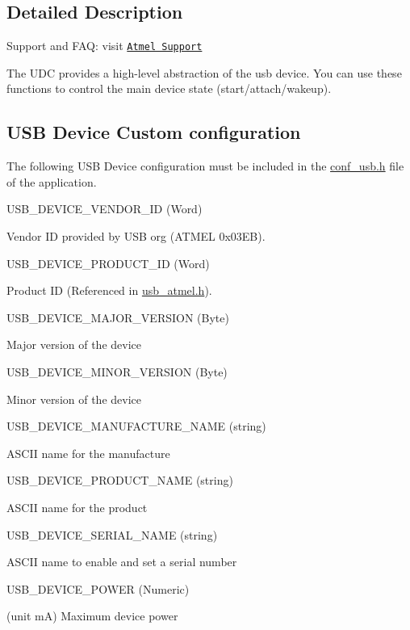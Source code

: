 \subsection{Detailed Description}
Support and F\-A\-Q\-: visit \href{http://www.atmel.com/design-support/}{\tt Atmel Support}

The U\-D\-C provides a high-\/level abstraction of the usb device. You can use these functions to control the main device state (start/attach/wakeup).\hypertarget{group__udc__group_USB_DEVICE_CONF}{}\subsection{U\-S\-B Device Custom configuration}\label{group__udc__group_USB_DEVICE_CONF}
The following U\-S\-B Device configuration must be included in the \hyperlink{conf__usb_8h}{conf\-\_\-usb.\-h} file of the application.

U\-S\-B\-\_\-\-D\-E\-V\-I\-C\-E\-\_\-\-V\-E\-N\-D\-O\-R\-\_\-\-I\-D (Word)\par
 Vendor I\-D provided by U\-S\-B org (A\-T\-M\-E\-L 0x03\-E\-B).

U\-S\-B\-\_\-\-D\-E\-V\-I\-C\-E\-\_\-\-P\-R\-O\-D\-U\-C\-T\-\_\-\-I\-D (Word)\par
 Product I\-D (Referenced in \hyperlink{usb__atmel_8h}{usb\-\_\-atmel.\-h}).

U\-S\-B\-\_\-\-D\-E\-V\-I\-C\-E\-\_\-\-M\-A\-J\-O\-R\-\_\-\-V\-E\-R\-S\-I\-O\-N (Byte)\par
 Major version of the device

U\-S\-B\-\_\-\-D\-E\-V\-I\-C\-E\-\_\-\-M\-I\-N\-O\-R\-\_\-\-V\-E\-R\-S\-I\-O\-N (Byte)\par
 Minor version of the device

U\-S\-B\-\_\-\-D\-E\-V\-I\-C\-E\-\_\-\-M\-A\-N\-U\-F\-A\-C\-T\-U\-R\-E\-\_\-\-N\-A\-M\-E (string)\par
 A\-S\-C\-I\-I name for the manufacture

U\-S\-B\-\_\-\-D\-E\-V\-I\-C\-E\-\_\-\-P\-R\-O\-D\-U\-C\-T\-\_\-\-N\-A\-M\-E (string)\par
 A\-S\-C\-I\-I name for the product

U\-S\-B\-\_\-\-D\-E\-V\-I\-C\-E\-\_\-\-S\-E\-R\-I\-A\-L\-\_\-\-N\-A\-M\-E (string)\par
 A\-S\-C\-I\-I name to enable and set a serial number

U\-S\-B\-\_\-\-D\-E\-V\-I\-C\-E\-\_\-\-P\-O\-W\-E\-R (Numeric)\par
 (unit m\-A) Maximum device power

